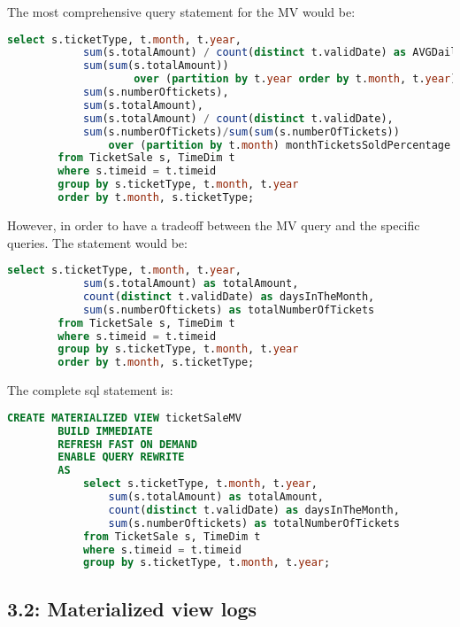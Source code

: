 \begin{answer}
    The most comprehensive query statement for the MV would be:
    \begin{lstlisting}[language = SQL]
        select s.ticketType, t.month, t.year,
            sum(s.totalAmount) / count(distinct t.validDate) as AVGDailyRevenue,
            sum(sum(s.totalAmount))
                    over (partition by t.year order by t.month, t.year) as AccRevenue,
            sum(s.numberOftickets),
            sum(s.totalAmount),
            sum(s.totalAmount) / count(distinct t.validDate),
            sum(s.numberOfTickets)/sum(sum(s.numberOfTickets))
                over (partition by t.month) monthTicketsSoldPercentage
        from TicketSale s, TimeDim t
        where s.timeid = t.timeid
        group by s.ticketType, t.month, t.year
        order by t.month, s.ticketType;
    \end{lstlisting}
    However, in order to have a tradeoff between the MV query and the specific queries. The statement would be:
    \begin{lstlisting}[language = SQL]
        select s.ticketType, t.month, t.year,
            sum(s.totalAmount) as totalAmount,
            count(distinct t.validDate) as daysInTheMonth,
            sum(s.numberOftickets) as totalNumberOfTickets
        from TicketSale s, TimeDim t
        where s.timeid = t.timeid
        group by s.ticketType, t.month, t.year
        order by t.month, s.ticketType;
    \end{lstlisting}
    The complete sql statement is:
    \begin{lstlisting}[language = SQL]
        CREATE MATERIALIZED VIEW ticketSaleMV
        BUILD IMMEDIATE
        REFRESH FAST ON DEMAND
        ENABLE QUERY REWRITE
        AS
            select s.ticketType, t.month, t.year,
                sum(s.totalAmount) as totalAmount,
                count(distinct t.validDate) as daysInTheMonth,
                sum(s.numberOftickets) as totalNumberOfTickets
            from TicketSale s, TimeDim t
            where s.timeid = t.timeid
            group by s.ticketType, t.month, t.year;
    \end{lstlisting}

\end{answer}

\subsection{3.2: Materialized view logs}

